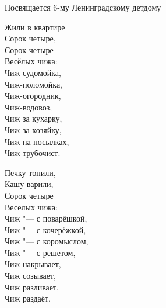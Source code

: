\begin{flushright}
    Посвящается 6-му Ленинградскому детдому 
\end{flushright} 

\begin{center}
\begin{minipage}{0.5\textwidth}
Жили в квартире\\ 
Сорок четыре, \\
Сорок четыре \\
Весёлых чижа: \\
Чиж-судомойка, \\
Чиж-поломойка, \\
Чиж-огородник, \\
Чиж-водовоз, \\
Чиж за кухарку, \\
Чиж за хозяйку, \\
Чиж на посылках, \\
Чиж-трубочист. 
\end{minipage}
\end{center}
\begin{center}
\begin{minipage}{0.45\textwidth}
Печку топили, \\
Кашу варили, \\
Сорок четыре \\
Веселых чижа: \\
Чиж "--- с поварёшкой, \\
Чиж "--- с кочерёжкой, \\
Чиж "--- с коромыслом, \\
Чиж "--- с решетом, \\
Чиж накрывает, \\
Чиж созывает, \\
Чиж разливает, \\
Чиж раздаёт. 
\end{minipage}
\end{center}

